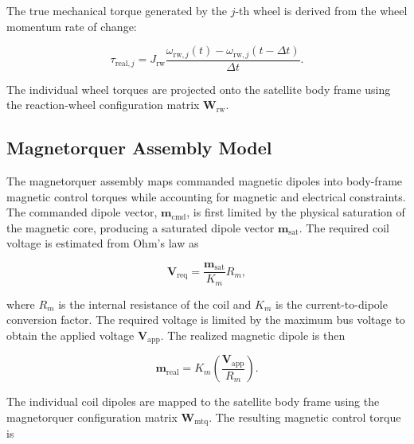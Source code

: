 The true mechanical torque generated by the \(j\)-th wheel is derived from the wheel momentum rate of change:

\begin{equation}
    \tau_{\mathrm{real},j}
    =
    J_{\mathrm{rw}}
    \frac{
        \omega_{\mathrm{rw},j}(t)
        -
        \omega_{\mathrm{rw},j}(t-\Delta t)
    }{
        \Delta t
    }.
    \label{eq:app_adcs_rw_real_torque}
\end{equation}

The individual wheel torques are projected onto the satellite body frame using the reaction-wheel configuration matrix \(\mathbf{W}_{\mathrm{rw}}\).

\subsection{Magnetorquer Assembly Model}
\label{app:adcs_magnetorquer_model}

The magnetorquer assembly maps commanded magnetic dipoles into body-frame magnetic control torques while accounting for magnetic and electrical constraints. The commanded dipole vector, \(\mathbf{m}_{\mathrm{cmd}}\), is first limited by the physical saturation of the magnetic core, producing a saturated dipole vector \(\mathbf{m}_{\mathrm{sat}}\). The required coil voltage is estimated from Ohm's law as

\begin{equation}
    \mathbf{V}_{\mathrm{req}}
    =
    \frac{
        \mathbf{m}_{\mathrm{sat}}
    }{
        K_m
    }
    R_m,
    \label{eq:app_adcs_mtq_required_voltage}
\end{equation}

where \(R_m\) is the internal resistance of the coil and \(K_m\) is the current-to-dipole conversion factor. The required voltage is limited by the maximum bus voltage to obtain the applied voltage \(\mathbf{V}_{\mathrm{app}}\). The realized magnetic dipole is then

\begin{equation}
    \mathbf{m}_{\mathrm{real}}
    =
    K_m
    \left(
        \frac{
            \mathbf{V}_{\mathrm{app}}
        }{
            R_m
        }
    \right).
    \label{eq:app_adcs_mtq_real_dipole}
\end{equation}

The individual coil dipoles are mapped to the satellite body frame using the magnetorquer configuration matrix \(\mathbf{W}_{\mathrm{mtq}}\). The resulting magnetic control torque is

